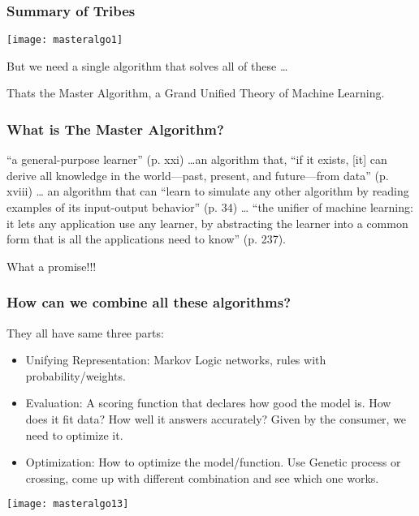 \begin{frame}[fragile]\frametitle{Summary of Tribes}
 
 \begin{center}
\texttt{[image: masteralgo1]}
\end{center}

But we need a single algorithm that solves all of these \ldots

Thats the Master Algorithm, a Grand Unified Theory of Machine Learning.
\end{frame}



\begin{frame}[fragile]\frametitle{What is The Master Algorithm?}
{\it 

``a general-purpose learner” (p. xxi) \ldots an algorithm that, ``if it exists, [it] 
can derive all knowledge in the world—past, present, and 
future—from data'' (p. xviii) \ldots 
an algorithm that can “learn to simulate any other algorithm by 
reading examples of its input-output behavior” (p. 34) \ldots
 ``the unifier of machine learning: it lets any application use any learner, 
 by abstracting the learner into a common form that is all the applications need to know'' (p. 237).
}

What a promise!!!
\end{frame}

\begin{frame}[fragile]\frametitle{How can we combine all these algorithms?}
They all have same three parts:
  \begin{itemize}
    \item Unifying Representation: Markov Logic networks, rules with probability/weights.
	\item Evaluation: A scoring function that declares how good the model is. How does it fit data? How well it answers accurately? Given by the consumer, we need to optimize it.
	\item Optimization: How to optimize the model/function. Use Genetic process or crossing, come up with different combination and see which one works.
  \end{itemize}

\begin{center}
\texttt{[image: masteralgo13]}
\end{center}

\end{frame}


